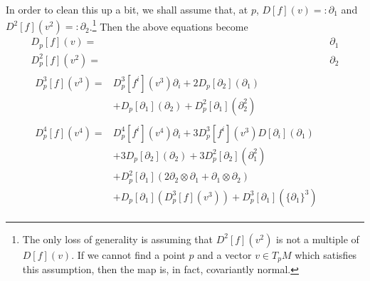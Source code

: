\documentclass[11pt]{article}
\theoremstyle{remark}
\begin{document}
In order to clean this up a bit, we shall assume that, at $p$, 
 $D[f](v) \ensuremath{=:} \partial_1$ and $D^2[f](v^2) \ensuremath{=:}
 \partial_2$.\footnote{The only loss of generality is assuming that
 $ D^2[f](v^2)$ is not a multiple of $D[f](v)$. If we cannot find a
 point $p$ and a vector $v \in T_pM$ which satisfies this assumption,
 then the map
 is, in fact, covariantly normal.}  
Then the above equations become
\begin{subequations}
\begin{align}
D_p[f] (v) =& \partial_1
\\
D^2_p[f] (v^2) =& \partial_2
\label{te:fcov2}
\\
\begin{split}
D^3_p[f] (v^3) =& 
D^3_p[f^i](v^3) \partial_i 
+2 D_p[\partial_2](\partial_1)\\
&+D_p[\partial_1](\partial_2)
+ D^2_p[\partial_1](\partial_2^2)
\end{split}
\label{te:fcov3}
\\
\begin{split}
D^4_p[f] (v^4) =& 
D^4_p[f^i](v^4) \partial_i 
+3D^3_p[f^i](v^3) D[\partial_i](\partial_1) 
\\&
+3 D_p[\partial_2](\partial_2)
+3 D^2_p[\partial_2](\partial_1^2)
\\&
+ D^2_p[\partial_1](2\partial_2\otimes \partial_1 + \partial_1\otimes
\partial_2)
\\&
+ D_p[\partial_1](D_p^3[f](v^3))
+D^3_p[\partial_1](\{\partial_1\}^3) 
\end{split}
\label{te:fcov4}
\end{align}
\end{subequations} 
 
\end{document}
